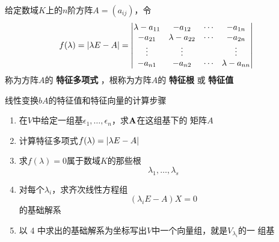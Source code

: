 \documentclass[11pt]{article}
\begin{document}
给定数域\(K\)上的\(n\)阶方阵\(A=(a_{ij})\)，令
\begin{equation*}
f(\lambda)=\abs{\lambda E-A}=
\begin{vmatrix}
\lambda-a_{11}&-a_{12}&\cdots&-a_{1n}\\
-a_{21}&\lambda-a_{22}&\cdots&-a_{2n}\\
\vdots&\vdots&&\vdots\\
-a_{n1}&-a_{n2}&\cdots&\lambda-a_{nn}
\end{vmatrix}
\end{equation*}
称为方阵\(A\)的 \textbf{特征多项式} ，根称为方阵\(A\)的 \textbf{特征根} 或 \textbf{特征值}


线性变换\(bA\)的特征值和特征向量的计算步骤
\begin{enumerate}
\item 在\(V\)中给定一组基\(\epsilon_1,\dots,\epsilon_n\)，求\(\operatorname{\textbf{A}}\)在这组基下的
矩阵\(A\)
\item 计算特征多项式\(f(\lambda)=\abs{\lambda E-A}\)
\item 求\(f(\lambda)=0\)属于数域\(K\)的那些根
\begin{equation*}
\lambda_1,\dots,\lambda_s
\end{equation*}
\item 对每个\(\lambda_i\)，求齐次线性方程组
\begin{equation*}
(\lambda_i E-A)X=0
\end{equation*}
的基础解系
\item 以 4 中求出的基础解系为坐标写出\(V\)中一个向量组，就是\(V_{\lambda_i}\)的一
组基
\end{enumerate}
\end{document}
